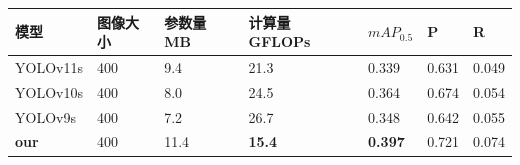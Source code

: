 \begin{table}[htbp]
    \centering
    \captionsetup{font=footnotesize}
    \label{tab:compare_studies_fogvd}
    \begin{tabular}{p{}p{}p{}p{}p{}p{}p{}}
        \toprule
        模型         & 图像大小 & 参数量 MB & 计算量 GFLOPs  & $mAP_{0.5}$     & P     & R     \\ %
        \midrule
        YOLOv11s     & 400     & 9.4   & 21.3          & 0.339           & 0.631  & 0.049 \\%
        YOLOv10s     & 400     & 8.0   & 24.5          & 0.364           & 0.674  & 0.054 \\%
        YOLOv9s      & 400     & 7.2   & 26.7          & 0.348           & 0.642  & 0.055 \\%
        \textbf{our} & 400     & 11.4  & \textbf{15.4} & \textbf{0.397}  & 0.721  & 0.074 \\%
        \bottomrule
    \end{tabular}
\end{table}

